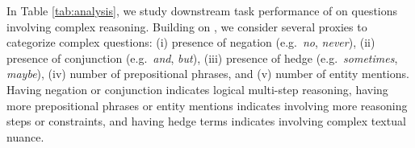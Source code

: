  \begin{table}[t]
    \centering
    \vspace{1mm}
    \caption{\footnotesize
    Accuracy of \methodname on \textit{CSQA} + \textit{OBQA} dev sets for \textbf{questions involving complex reasoning} such as negation terms, conjunction terms, hedge terms, prepositional phrases, and more entity mentions. 
    \methodname consistently outperforms the existing LM (RoBERTa) and KG-augmented QA models (QAGNN, GreaseLM) in these complex reasoning settings.
    }
    \label{tab:analysis}
\vspace{-4mm}
\end{table} 
In Table \ref{tab:analysis}, we study downstream task performance of \methodname on questions involving complex reasoning. Building on \cite{yasunaga2021qa, zhang2022greaselm}, we consider several proxies to categorize complex questions: (i) presence of negation (e.g.~\textit{no}, \textit{never}), (ii) presence of conjunction (e.g.~\textit{and}, \textit{but}), (iii) presence of hedge (e.g.~\textit{sometimes}, \textit{maybe}), (iv) number of prepositional phrases, and (v) number of entity mentions. Having negation or conjunction indicates logical multi-step reasoning, having more prepositional phrases or entity mentions indicates involving more reasoning steps or constraints, and having hedge terms indicates involving complex textual nuance.
